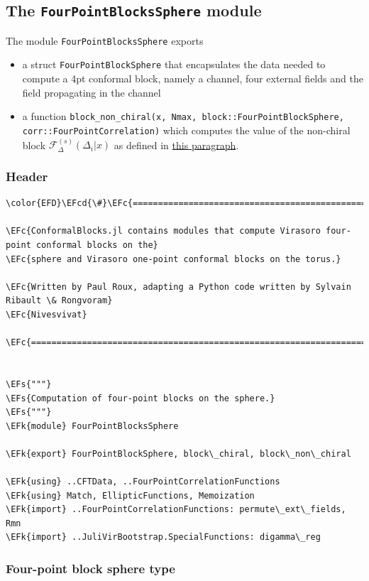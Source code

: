 \documentclass[a4paper]{article}
\numberwithin{equation}{section}
\newcommand{\EFc}[1]{\textcolor{EFc}{#1}} %
\newcommand{\EFcd}[1]{\textcolor{EFcd}{#1}} %
\newcommand{\EFs}[1]{\textcolor{EFs}{#1}} %
\newcommand{\EFk}[1]{\textcolor{EFk}{#1}} %
\begin{document}
\subsection{The \texttt{FourPointBlocksSphere} module}
\label{sec:orgded16e1}
The module \texttt{FourPointBlocksSphere} exports

\begin{itemize}
\item a struct \texttt{FourPointBlockSphere} that encapsulates the data needed to compute a 4pt conformal block, namely a channel, four external fields and the field propagating in the channel
\item a function \texttt{block\_non\_chiral(x, Nmax, block::FourPointBlockSphere, corr::FourPointCorrelation)} which computes the value of the non-chiral block \(\mathcal F_{\Delta}^{(s)}(\Delta_i | x)\) as defined in \hyperref[sec:orgab31910]{this paragraph}.
\end{itemize}
\subsubsection*{Header}
\label{sec:org914bb1e}

\begin{Code}
\begin{Verbatim}
\color{EFD}\EFcd{\#}\EFc{===========================================================================================}

\EFc{ConformalBlocks.jl contains modules that compute Virasoro four-point conformal blocks on the}
\EFc{sphere and Virasoro one-point conformal blocks on the torus.}

\EFc{Written by Paul Roux, adapting a Python code written by Sylvain Ribault \& Rongvoram}
\EFc{Nivesvivat}

\EFc{===========================================================================================\#}


\EFs{"""}
\EFs{Computation of four-point blocks on the sphere.}
\EFs{"""}
\EFk{module} FourPointBlocksSphere

\EFk{export} FourPointBlockSphere, block\_chiral, block\_non\_chiral

\EFk{using} ..CFTData, ..FourPointCorrelationFunctions
\EFk{using} Match, EllipticFunctions, Memoization
\EFk{import} ..FourPointCorrelationFunctions: permute\_ext\_fields, Rmn
\EFk{import} ..JuliVirBootstrap.SpecialFunctions: digamma\_reg
\end{Verbatim}
\end{Code}
\subsubsection*{Four-point block sphere type}
\label{sec:org2e06355}
\end{document}
